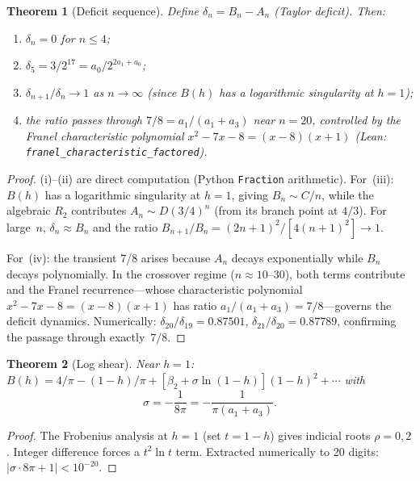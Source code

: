 \documentclass[12pt]{article}
\newtheorem{theorem}{Theorem}[section]
\begin{document}
\begin{theorem}[Deficit sequence]\label{thm:deficit}
Define $\delta_n = B_n - A_n$ (Taylor deficit). Then:
\begin{enumerate}
\item[(i)] $\delta_n = 0$ for $n \le 4$;
\item[(ii)] $\delta_5 = 3/2^{17} = a_0/2^{2a_1+a_0}$;
\item[(iii)] $\delta_{n+1}/\delta_n \to 1$ as $n \to \infty$ (since $B(h)$ has a logarithmic singularity at $h = 1$);
\item[(iv)] the ratio passes through $7/8 = a_1/(a_1+a_3)$ near $n = 20$, controlled by the Franel characteristic polynomial $x^2 - 7x - 8 = (x-8)(x+1)$ (Lean: \texttt{franel\_characteristic\_factored}).
\end{enumerate}
\end{theorem}

\begin{proof}
(i)--(ii) are direct computation (Python \texttt{Fraction} arithmetic).
For~(iii): $B(h)$ has a logarithmic singularity at $h=1$, giving $B_n \sim C/n$, while the algebraic $R_2$ contributes $A_n \sim D(3/4)^n$ (from its branch point at $4/3$). For large~$n$, $\delta_n \approx B_n$ and the ratio $B_{n+1}/B_n = (2n+1)^2/[4(n+1)^2] \to 1$.

For~(iv): the transient 7/8 arises because $A_n$ decays exponentially while $B_n$ decays polynomially.  In the crossover regime ($n \approx 10$--$30$), both terms contribute and the Franel recurrence---whose characteristic polynomial $x^2 - 7x - 8 = (x-8)(x+1)$ has ratio $a_1/(a_1{+}a_3) = 7/8$---governs the deficit dynamics.  Numerically: $\delta_{20}/\delta_{19} = 0.87501$, $\delta_{21}/\delta_{20} = 0.87789$, confirming the passage through exactly~$7/8$.
\end{proof}

\begin{theorem}[Log shear]
Near $h = 1$: $B(h) = 4/\pi - (1{-}h)/\pi + [\beta_2 + \sigma\ln(1{-}h)](1{-}h)^2 + \cdots$ with
\begin{equation}
\sigma = -\frac{1}{8\pi} = -\frac{1}{\pi(a_1+a_3)}.
\end{equation}
\end{theorem}

\begin{proof}
The Frobenius analysis at $h=1$ (set $t=1-h$) gives indicial roots $\rho = 0, 2$.
Integer difference forces a $t^2\ln t$ term. Extracted numerically to 20 digits:
$|\sigma\cdot 8\pi + 1| < 10^{-20}$.
\end{proof}
\end{document}
